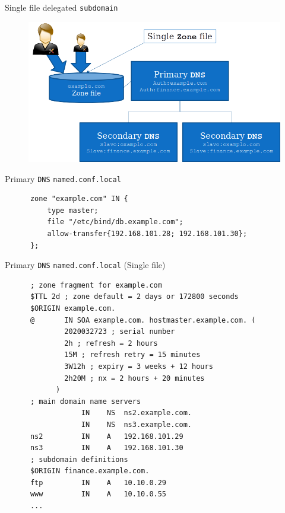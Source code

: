 \documentclass[xcolor=table]{beamer}
\begin{document}
\begin{frame}{Single file delegated \texttt{subdomain}}
  \begin{figure}
    \begin{center}
      \includegraphics[width=0.8\linewidth]{SingleDelegated.png}
    \end{center}
  \end{figure}
\end{frame}

\begin{frame}[fragile]{Primary \texttt{DNS} \texttt{named.conf.local}}
  \begin{tcolorbox}
    \lstset{
      basicstyle=\tiny\ttfamily,
    }
    \begin{lstlisting}
      zone "example.com" IN {
	      type master;
	      file "/etc/bind/db.example.com";
	      allow-transfer{192.168.101.28; 192.168.101.30};
      };
    \end{lstlisting}
  \end{tcolorbox}
\end{frame}

\begin{frame}[fragile]{Primary \texttt{DNS} \texttt{named.conf.local} (Single file)}
  \begin{tcolorbox}
    \lstset{
      basicstyle=\tiny\ttfamily,
    }
    \begin{lstlisting}
      ; zone fragment for example.com
      $TTL 2d ; zone default = 2 days or 172800 seconds
      $ORIGIN example.com.
      @	      IN SOA example.com. hostmaster.example.com. (
	          2020032723 ; serial number
	          2h ; refresh = 2 hours
	          15M ; refresh retry = 15 minutes
	          3W12h ; expiry = 3 weeks + 12 hours
	          2h20M ; nx = 2 hours + 20 minutes
            )
      ; main domain name servers
		          IN    NS 	ns2.example.com.
		          IN    NS 	ns3.example.com.
      ns2 		  IN    A 	192.168.101.29
      ns3 		  IN    A 	192.168.101.30
      ; subdomain definitions
      $ORIGIN finance.example.com.
      ftp 		  IN    A   10.10.0.29
      www		  IN    A   10.10.0.55
      ...
    \end{lstlisting}
  \end{tcolorbox}
\end{frame}
\end{document}
